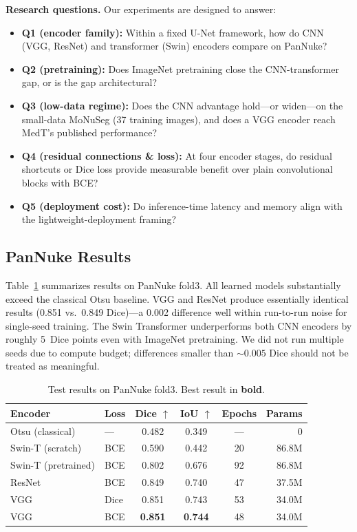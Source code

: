 \documentclass{article}
\begin{document}
\textbf{Research questions.} Our experiments are designed to answer:
\begin{itemize}
    \item \textbf{Q1 (encoder family):} Within a fixed U-Net framework, how do CNN (VGG, ResNet) and transformer (Swin) encoders compare on PanNuke?
    \item \textbf{Q2 (pretraining):} Does ImageNet pretraining close the CNN-transformer gap, or is the gap architectural?
    \item \textbf{Q3 (low-data regime):} Does the CNN advantage hold---or widen---on the small-data MoNuSeg (37 training images), and does a VGG encoder reach MedT's published performance?
    \item \textbf{Q4 (residual connections \& loss):} At four encoder stages, do residual shortcuts or Dice loss provide measurable benefit over plain convolutional blocks with BCE?
    \item \textbf{Q5 (deployment cost):} Do inference-time latency and memory align with the lightweight-deployment framing?
\end{itemize}

\subsection{PanNuke Results}

Table~\ref{tab:pannuke_results} summarizes results on PanNuke fold3. All learned models substantially exceed the classical Otsu baseline. VGG and ResNet produce essentially identical results (0.851 vs.\ 0.849 Dice)---a 0.002 difference well within run-to-run noise for single-seed training. The Swin Transformer underperforms both CNN encoders by roughly 5~Dice points even with ImageNet pretraining. We did not run multiple seeds due to compute budget; differences smaller than ${\sim}0.005$ Dice should not be treated as meaningful.

\begin{table}[h]
\centering
\caption{Test results on PanNuke fold3. Best result in \textbf{bold}.}
\label{tab:pannuke_results}
\small
\begin{tabular}{@{}llcccr@{}}
\toprule
\textbf{Encoder} & \textbf{Loss} & \textbf{Dice} $\uparrow$ & \textbf{IoU} $\uparrow$ & \textbf{Epochs} & \textbf{Params} \\
\midrule
Otsu (classical) & --- & 0.482 & 0.349 & --- & 0 \\
\midrule
Swin-T (scratch) & BCE & 0.590 & 0.442 & 20 & 86.8M \\
Swin-T (pretrained) & BCE & 0.802 & 0.676 & 92 & 86.8M \\
ResNet & BCE & 0.849 & 0.740 & 47 & 37.5M \\
VGG & Dice & 0.851 & 0.743 & 53 & 34.0M \\
VGG & BCE & \textbf{0.851} & \textbf{0.744} & 48 & 34.0M \\
\bottomrule
\end{tabular}
\end{table}
\end{document}
